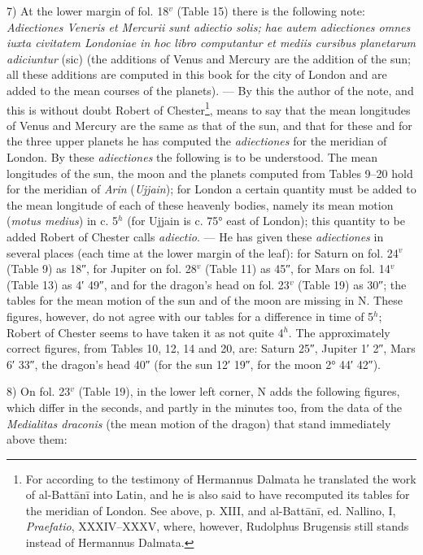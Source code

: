 \documentclass[11pt]{article}
\newcommand{\Pg}[1]{\marginpar{\footnotesize\color{gray}#1}}
\begin{document}
\par \Pg{XIX}7) At the lower margin of fol. 18$^{v}$ (Table 15) there is the following note: \emph{Adiectiones Veneris et Mercurii sunt adiectio solis; hae autem adiectiones omnes iuxta civitatem Londoniae in hoc libro computantur et mediis cursibus planetarum adiciuntur} (sic) (the additions of Venus and Mercury are the addition of the sun; all these additions are computed in this book for the city of London and are added to the mean courses of the planets). — By this the author of the note, and this is without doubt Robert of Chester\footnote{For according to the testimony of Hermannus Dalmata he translated the work of al-Battānī into Latin, and he is also said to have recomputed its tables for the meridian of London. See above, p. XIII, and al-Battānī, ed. Nallino, I, \emph{Praefatio}, XXXIV–XXXV, where, however, Rudolphus Brugensis still stands instead of Hermannus Dalmata.}, means to say that the mean longitudes of Venus and Mercury are the same as that of the sun, and that for these and for the three upper planets he has computed the \emph{adiectiones} for the meridian of London. By these \emph{adiectiones} the following is to be understood. The mean longitudes of the sun, the moon and the planets computed from Tables 9–20 hold for the meridian of \emph{Arin} (\emph{Ujjain}); for London a certain quantity must be added to the mean longitude of each of these heavenly bodies, namely its mean motion (\emph{motus medius}) in c. 5$^{h}$ (for Ujjain is c. 75° east of London); this quantity to be added Robert of Chester calls \emph{adiectio}. — He has given these \emph{adiectiones} in several places (each time at the lower margin of the leaf): for Saturn on fol. 24$^{v}$ (Table 9) as 18″, for Jupiter on fol. 28$^{v}$ (Table 11) as 45″, for Mars on fol. 14$^{v}$ (Table 13) as 4′ 49″, and for the dragon's head on fol. 23$^{v}$ (Table 19) as 30″; the tables for the mean motion of the sun and of the moon are missing in N. These figures, however, do not agree with our tables for a difference in time of 5$^{h}$; Robert of Chester seems to have taken it as not quite 4$^{h}$. The approximately correct figures, from Tables 10, 12, 14 and 20, are: Saturn 25″, Jupiter 1′ 2″, Mars 6′ 33″, the dragon's head 40″ (for the sun 12′ 19″, for the moon 2° 44′ 42″).\par
\par 8) On fol. 23$^{v}$ (Table 19), in the lower left corner, N adds the following figures, which differ in the seconds, and partly in the minutes too, from the data of the \emph{Medialitas draconis} (the mean motion of the dragon) that stand immediately above them:\par
\end{document}
